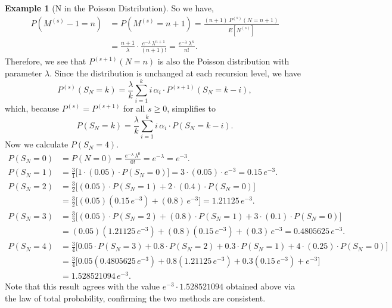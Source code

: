 \documentclass[11pt]{amsart}
\theoremstyle{definition}
\newtheorem{example}{Example}
\theoremstyle{plain}
\begin{document}
\begin{example}[N in the Poisson Distribution]
So we have,
\begin{align*}
P(M^{(s)} - 1 = n)
    &= P(M^{(s)} = n + 1)
     = \frac{(n+1)\,P^{(s)}(N = n+1)}{E[N^{(s)}]} \\
    &= \frac{n+1}{\lambda} \cdot \frac{e^{-\lambda}\,\lambda^{n+1}}{(n+1)!}
     = \frac{e^{-\lambda}\,\lambda^n}{n!}.
\end{align*}
Therefore, we see that $P^{(s+1)}(N = n)$ is also the Poisson distribution with parameter
$\lambda$.  Since the distribution is unchanged at each recursion level, we have
\[
    P^{(s)}(S_N = k) = \frac{\lambda}{k} \sum_{i=1}^{k} i\,\alpha_i \cdot P^{(s+1)}(S_N = k - i),
\]
which, because $P^{(s)} = P^{(s+1)}$ for all $s \geq 0$, simplifies to
\[
    P(S_N = k) = \frac{\lambda}{k} \sum_{i=1}^{k} i\,\alpha_i \cdot P(S_N = k - i).
\]
Now we calculate $P(S_N = 4)$.
\begin{align*}
P(S_N = 0)
    &= P(N = 0) = \frac{e^{-\lambda}\,\lambda^0}{0!} = e^{-\lambda} = e^{-3}. \\
P(S_N = 1)
    &= \frac{3}{1}\bigl[1 \cdot (0.05) \cdot P(S_N = 0)\bigr]
     = 3 \cdot (0.05) \cdot e^{-3}
     = 0.15\,e^{-3}. \\
P(S_N = 2)
    &= \frac{3}{2}\bigl[(0.05) \cdot P(S_N = 1) + 2 \cdot (0.4) \cdot P(S_N = 0)\bigr] \\
    &= \frac{3}{2}\bigl[(0.05)(0.15\,e^{-3}) + (0.8)\,e^{-3}\bigr]
     = 1.21125\,e^{-3}. \\
P(S_N = 3)
    &= \frac{3}{3}\bigl[(0.05) \cdot P(S_N = 2) + (0.8) \cdot P(S_N = 1)
       + 3 \cdot (0.1) \cdot P(S_N = 0)\bigr] \\
    &= (0.05)(1.21125\,e^{-3}) + (0.8)(0.15\,e^{-3}) + (0.3)\,e^{-3}
     = 0.4805625\,e^{-3}. \\
P(S_N = 4)
    &= \frac{3}{4}\bigl[0.05 \cdot P(S_N = 3) + 0.8 \cdot P(S_N = 2)
       + 0.3 \cdot P(S_N = 1) + 4 \cdot (0.25) \cdot P(S_N = 0)\bigr] \\
    &= \frac{3}{4}\bigl[0.05(0.4805625\,e^{-3}) + 0.8(1.21125\,e^{-3})
       + 0.3(0.15\,e^{-3}) + e^{-3}\bigr] \\
    &= 1.528521094\,e^{-3}.
\end{align*}
Note that this result agrees with the value $e^{-3} \cdot 1.528521094$ obtained above
via the law of total probability, confirming the two methods are consistent.
\end{example}
\end{document}
